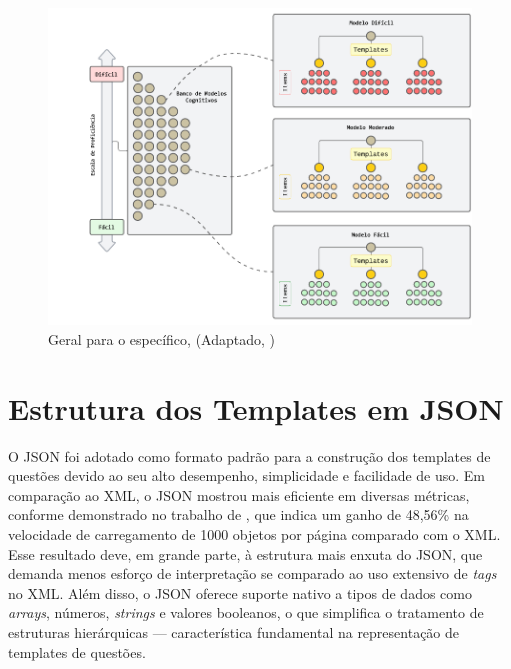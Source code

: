 \begin{figure}[ht]
	\centering
	\includegraphics[width=14cm]{./imagens/capitulo5/proficiency-scale-named}
	\caption{Geral para o específico, (Adaptado, \cite{hendrickson2010}) }
	\label{fig:proficiency-scale}
\end{figure}

\section{Estrutura dos Templates em JSON}

O JSON foi adotado como formato padrão para a construção dos templates de questões devido ao seu alto desempenho, simplicidade e facilidade de uso. Em comparação ao XML, o JSON mostrou mais eficiente em diversas métricas, conforme demonstrado no trabalho de \parencite{wang2011}, que indica um ganho de  48,56\% na velocidade de carregamento de 1000 objetos por página comparado com o XML. Esse resultado deve, em grande parte, à estrutura mais enxuta do JSON, que demanda menos esforço de interpretação se comparado ao uso extensivo de \textit{tags} no XML.  Além disso, o JSON oferece suporte nativo a tipos de dados como \textit{arrays}, números, \textit{strings} e valores booleanos, o que simplifica o tratamento de estruturas hierárquicas — característica fundamental na representação de templates de questões.

